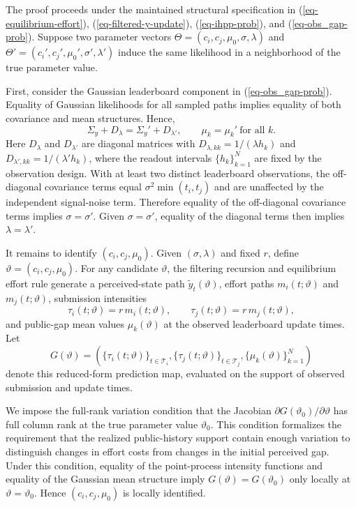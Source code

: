 \documentclass[mnsc]{informs3}
\begin{document}
\begin{APPENDICES}
The proof proceeds under the maintained structural specification in
(\ref{eq-equilibrium-effort}), (\ref{eq-filtered-y-update}),
(\ref{eq-ihpp-prob}), and (\ref{eq-obs_gap-prob}).
Suppose two parameter vectors $\Theta=(c_i,c_j,\mu_0,\sigma,\lambda)$ and
$\Theta'=(c_i',c_j',\mu_0',\sigma',\lambda')$ induce the same likelihood in a
neighborhood of the true parameter value.

First, consider the Gaussian leaderboard component in (\ref{eq-obs_gap-prob}). 
Equality of Gaussian likelihoods for all sampled paths implies equality of both covariance and mean structures. 
Hence,
\begin{equation*}
\Sigma_y + D_\lambda
=
\Sigma_y' + D_{\lambda'},
\qquad
\mu_k=\mu_k'\ \text{for all } k.
\end{equation*}
Here $D_\lambda$ and $D_{\lambda'}$ are diagonal matrices with $D_{\lambda,kk}=1/(\lambda h_k)$ and $D_{\lambda',kk}=1/(\lambda' h_k)$, where the readout intervals $\{h_k\}_{k=1}^N$ are fixed by the observation design.
With at least two distinct leaderboard observations, the off-diagonal covariance terms equal $\sigma^2\min(t_i,t_j)$ and are unaffected by the independent signal-noise term. 
Therefore equality of the off-diagonal covariance terms implies $\sigma=\sigma'$. Given $\sigma=\sigma'$, equality of the diagonal terms then implies $\lambda=\lambda'$.

It remains to identify $(c_i,c_j,\mu_0)$.
Given $(\sigma,\lambda)$ and fixed $r$, define $\vartheta=(c_i,c_j,\mu_0)$.
For any candidate $\vartheta$, the filtering recursion and equilibrium effort rule generate a perceived-state path $\tilde y_t(\vartheta)$, effort paths $m_i(t;\vartheta)$ and $m_j(t;\vartheta)$, submission intensities
\[
\tau_i(t;\vartheta)=r\,m_i(t;\vartheta),
\qquad
\tau_j(t;\vartheta)=r\,m_j(t;\vartheta),
\]
and public-gap mean values $\mu_k(\vartheta)$ at the observed leaderboard update times.
Let
\[
G(\vartheta)
=
\left(
\{\tau_i(t;\vartheta)\}_{t\in\mathcal T_i},
\{\tau_j(t;\vartheta)\}_{t\in\mathcal T_j},
\{\mu_k(\vartheta)\}_{k=1}^N
\right)
\]
denote this reduced-form prediction map, evaluated on the support of observed submission and update times.

We impose the full-rank variation condition that the Jacobian
$\partial G(\vartheta_0)/\partial\vartheta$ has full column rank at the true parameter value $\vartheta_0$.
This condition formalizes the requirement that the realized public-history support contain enough variation to distinguish changes in effort costs from changes in the initial perceived gap.
Under this condition, equality of the point-process intensity functions and equality of the Gaussian mean structure imply $G(\vartheta)=G(\vartheta_0)$ only locally at $\vartheta=\vartheta_0$.
Hence $(c_i,c_j,\mu_0)$ is locally identified.


\end{APPENDICES}
\end{document}
